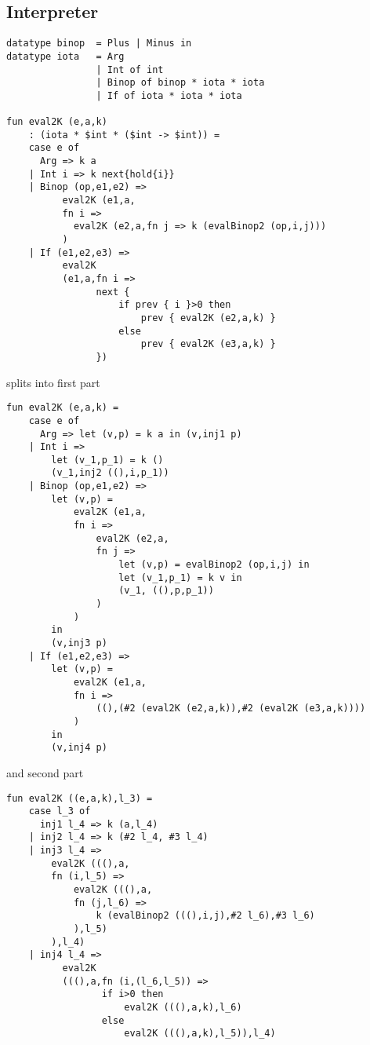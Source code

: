 \subsection{Interpreter}

\begin{lstlisting}
datatype binop  = Plus | Minus in
datatype iota	= Arg
				| Int of int 
				| Binop of binop * iota * iota
				| If of iota * iota * iota

fun eval2K (e,a,k) 
	: (iota * $int * ($int -> $int)) =
	case e of
	  Arg => k a
	| Int i => k next{hold{i}}
	| Binop (op,e1,e2) =>
		  eval2K (e1,a,
		  fn i => 
		    eval2K (e2,a,fn j => k (evalBinop2 (op,i,j)))
		  )
	| If (e1,e2,e3) =>
		  eval2K
		  (e1,a,fn i =>
				next {
					if prev { i }>0 then
						prev { eval2K (e2,a,k) }
					else
						prev { eval2K (e3,a,k) }
				})
\end{lstlisting}
splits into first part
\begin{lstlisting}
fun eval2K (e,a,k) =
	case e of
	  Arg => let (v,p) = k a in (v,inj1 p)
	| Int i =>
		let (v_1,p_1) = k ()
		(v_1,inj2 ((),i,p_1))
	| Binop (op,e1,e2) =>
		let (v,p) =
			eval2K (e1,a,
			fn i =>
				eval2K (e2,a,
				fn j =>
					let (v,p) = evalBinop2 (op,i,j) in
					let (v_1,p_1) = k v in
					(v_1, ((),p,p_1))
				)
			)
		in
		(v,inj3 p)
	| If (e1,e2,e3) =>
		let (v,p) =
			eval2K (e1,a,
			fn i =>
				((),(#2 (eval2K (e2,a,k)),#2 (eval2K (e3,a,k))))
			)
		in
		(v,inj4 p)
\end{lstlisting}
and second part
\begin{lstlisting}
fun eval2K ((e,a,k),l_3) =
	case l_3 of
	  inj1 l_4 => k (a,l_4)
	| inj2 l_4 => k (#2 l_4, #3 l_4)
	| inj3 l_4 =>
		eval2K (((),a,
		fn (i,l_5) =>
			eval2K (((),a,
			fn (j,l_6) => 
				k (evalBinop2 (((),i,j),#2 l_6),#3 l_6)
			),l_5)
		),l_4)
	| inj4 l_4 =>
		  eval2K
		  (((),a,fn (i,(l_6,l_5)) =>
				 if i>0 then
					 eval2K (((),a,k),l_6)
				 else
					 eval2K (((),a,k),l_5)),l_4)
\end{lstlisting}


